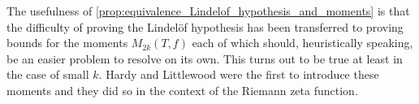     The usefulness of \cref{prop:equivalence_Lindelof_hypothesis_and_moments} is that the difficulty of proving the Lindel\"of hypothesis has been transferred to proving bounds for the moments $M_{2k}(T,f)$ each of which should, heuristically speaking, be an easier problem to resolve on its own. This turns out to be true at least in the case of small $k$. Hardy and Littlewood were the first to introduce these moments and they did so in the context of the Riemann zeta function. 
  \section{}